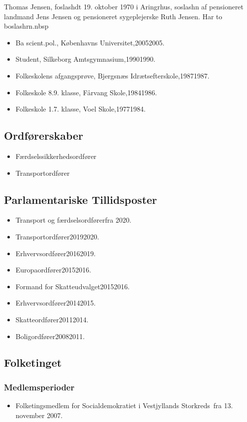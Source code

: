 \documentclass[11pt, a4paper]{awesome-cv}
\begin{document}
\makecvheader[R]
\makelettertitle
\begin{cvletter}
Thomas Jensen, foslashdt 19. oktober 1970 i Aringrhus, soslashn af pensioneret landmand Jens Jensen og pensioneret sygeplejerske Ruth Jensen. Har to boslashrn.nbsp

\begin{itemize}
\item Ba scient.pol., Københavns Universitet,20052005.
\item Student, Silkeborg Amtsgymnasium,19901990.
\item Folkeskolens afgangsprøve, Bjergsnæs Idrætsefterskole,19871987.
\item Folkeskole 8.9. klasse, Fårvang Skole,19841986.
\item Folkeskole 1.7. klasse, Voel Skole,19771984.
\end{itemize}
\subsection*{Ordførerskaber}
\begin{itemize}
\item Færdselssikkerhedsordfører
\item Transportordfører
\end{itemize}
\subsection*{Parlamentariske Tillidsposter}
\begin{itemize}
\item Transport og færdselsordførerfra 2020.
\item Transportordfører20192020.
\item Erhvervsordfører20162019.
\item Europaordfører20152016.
\item Formand for Skatteudvalget20152016.
\item Erhvervsordfører20142015.
\item Skatteordfører20112014.
\item Boligordfører20082011.
\end{itemize}
\subsection*{Folketinget}
\subsubsection*{Medlemsperioder}
\begin{itemize}
\item Folketingsmedlem for Socialdemokratiet i Vestjyllands Storkreds fra 13. november 2007.
\end{itemize}

\end{cvletter}
\end{document}
